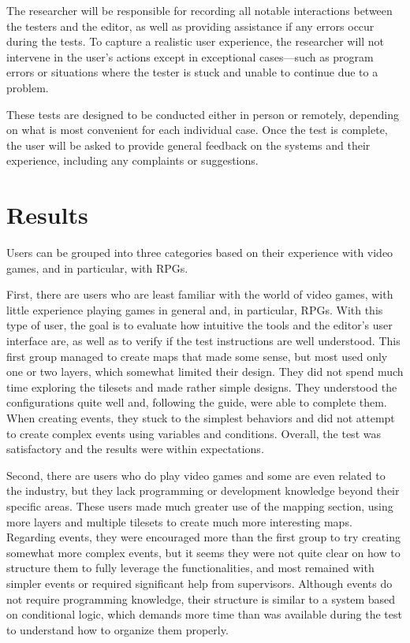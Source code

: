\medskip

The researcher will be responsible for recording all notable interactions between the testers and the editor, as well as providing assistance if any errors occur during the tests. To capture a realistic user experience, the researcher will not intervene in the user’s actions except in exceptional cases—such as program errors or situations where the tester is stuck and unable to continue due to a problem.

\smallskip

These tests are designed to be conducted either in person or remotely, depending on what is most convenient for each individual case. Once the test is complete, the user will be asked to provide general feedback on the systems and their experience, including any complaints or suggestions.

\section*{Results}

Users can be grouped into three categories based on their experience with video games, and in particular, with RPGs.

\smallskip

First, there are users who are least familiar with the world of video games, with little experience playing games in general and, in particular, RPGs. With this type of user, the goal is to evaluate how intuitive the tools and the editor’s user interface are, as well as to verify if the test instructions are well understood. This first group managed to create maps that made some sense, but most used only one or two layers, which somewhat limited their design. They did not spend much time exploring the tilesets and made rather simple designs. They understood the configurations quite well and, following the guide, were able to complete them. When creating events, they stuck to the simplest behaviors and did not attempt to create complex events using variables and conditions. Overall, the test was satisfactory and the results were within expectations.

\medskip

Second, there are users who do play video games and some are even related to the industry, but they lack programming or development knowledge beyond their specific areas. These users made much greater use of the mapping section, using more layers and multiple tilesets to create much more interesting maps. Regarding events, they were encouraged more than the first group to try creating somewhat more complex events, but it seems they were not quite clear on how to structure them to fully leverage the functionalities, and most remained with simpler events or required significant help from supervisors. Although events do not require programming knowledge, their structure is similar to a system based on conditional logic, which demands more time than was available during the test to understand how to organize them properly.

